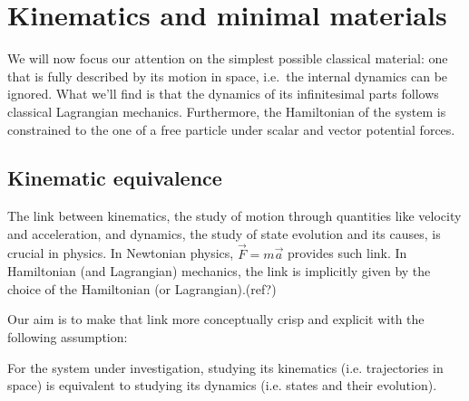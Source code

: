 \documentclass[smallextended]{svjour3}
\numberwithin{equation}{section}
\begin{document}
\section{Kinematics and minimal materials}
\label{sec:Lagrangian}

We will now focus our attention on the simplest possible classical material: one that is fully described by its motion in space, i.e.~the internal dynamics can be ignored. What we'll find is that the dynamics of its infinitesimal parts follows classical Lagrangian mechanics. Furthermore, the Hamiltonian of the system is constrained to the one of a free particle under scalar and vector potential forces.

\subsection{Kinematic equivalence}

The link between kinematics, the study of motion through quantities like velocity and acceleration, and dynamics, the study of state evolution and its causes, is crucial in physics. In Newtonian physics, $\vec{F}=m\vec{a}$ provides such link. In Hamiltonian (and Lagrangian) mechanics, the link is implicitly given by the choice of the Hamiltonian (or Lagrangian).(ref?)

Our aim is to make that link more conceptually crisp and explicit with the following assumption:

\begin{assump}\label{ass:kinematic_equivalence}
	For the system under investigation, studying its kinematics  (i.e. trajectories in space) is equivalent to studying its dynamics  (i.e. states and their evolution).
\end{assump}
\end{document}

